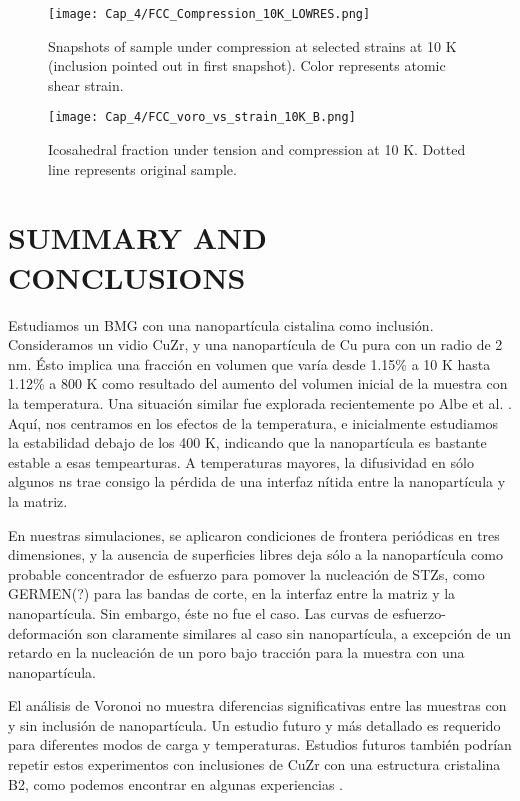 \begin{figure}[h!]
\centering
\texttt{[image: Cap\_4/FCC\_Compression\_10K\_LOWRES.png]}
\caption{Snapshots of sample under compression at selected strains at 10 K (inclusion pointed out in first snapshot). Color represents atomic shear strain.}
\label{figure:fcc_compression_bmg_10K}
\end{figure}

\clearpage

\begin{figure}[h!]
\centering
\texttt{[image: Cap\_4/FCC\_voro\_vs\_strain\_10K\_B.png]}
\caption{Icosahedral fraction under tension and compression at 10 K. Dotted line represents original sample.}
\label{figure:fcc_voro_10K}
\end{figure}

\section{SUMMARY AND CONCLUSIONS}

Estudiamos un BMG con una nanopartícula cistalina como inclusión. Consideramos un vidio CuZr, y una nanopartícula de Cu pura con un radio de 2 nm. Ésto implica una fracción en volumen que varía desde 1.15\% a 10 K hasta 1.12\% a 800 K como resultado del aumento del volumen inicial de la muestra con la temperatura. Una situación similar fue explorada recientemente po Albe et al. \cite{albe13}. Aquí, nos centramos en los efectos de la temperatura, e inicialmente estudiamos la estabilidad debajo de los 400 K, indicando que la nanopartícula es bastante estable a esas tempearturas. A temperaturas mayores, la difusividad en sólo algunos ns trae consigo la pérdida de una interfaz nítida entre la nanopartícula y la matriz.

En nuestras simulaciones, se aplicaron condiciones de frontera periódicas en tres dimensiones, y la ausencia de superficies libres deja sólo a la nanopartícula como probable concentrador de esfuerzo para pomover la nucleación de STZs, como GERMEN(?) para las bandas de corte, en la interfaz entre la matriz y la nanopartícula. Sin embargo, éste no fue el caso. Las curvas de esfuerzo-deformación son claramente similares al caso sin nanopartícula, a excepción de un retardo en la nucleación de un poro bajo tracción para la muestra con una nanopartícula.

El análisis de Voronoi no muestra diferencias significativas entre las muestras con y sin inclusión de nanopartícula. Un estudio futuro y más detallado es requerido para diferentes modos de carga y temperaturas. Estudios futuros también podrían repetir estos experimentos con inclusiones de CuZr con una estructura cristalina B2, como podemos encontrar en algunas experiencias \cite{wei14, kuo14}.